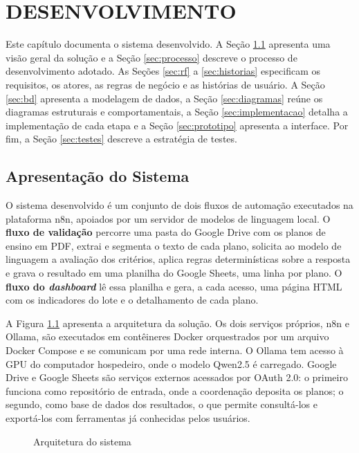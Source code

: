 \chapter{DESENVOLVIMENTO}
\label{cap:desenvolvimento}

Este capítulo documenta o sistema desenvolvido. A Seção \ref{sec:apresentacao} apresenta uma visão geral da solução e a Seção \ref{sec:processo} descreve o processo de desenvolvimento adotado. As Seções \ref{sec:rf} a \ref{sec:historias} especificam os requisitos, os atores, as regras de negócio e as histórias de usuário. A Seção \ref{sec:bd} apresenta a modelagem de dados, a Seção \ref{sec:diagramas} reúne os diagramas estruturais e comportamentais, a Seção \ref{sec:implementacao} detalha a implementação de cada etapa e a Seção \ref{sec:prototipo} apresenta a interface. Por fim, a Seção \ref{sec:testes} descreve a estratégia de testes.

\section{Apresentação do Sistema}
\label{sec:apresentacao}

O sistema desenvolvido é um conjunto de dois fluxos de automação executados na plataforma n8n, apoiados por um servidor de modelos de linguagem local. O \textbf{fluxo de validação} percorre uma pasta do Google Drive com os planos de ensino em PDF, extrai e segmenta o texto de cada plano, solicita ao modelo de linguagem a avaliação dos critérios, aplica regras determinísticas sobre a resposta e grava o resultado em uma planilha do Google Sheets, uma linha por plano. O \textbf{fluxo do \textit{dashboard}} lê essa planilha e gera, a cada acesso, uma página HTML com os indicadores do lote e o detalhamento de cada plano.

A Figura \ref{fig:arquitetura} apresenta a arquitetura da solução. Os dois serviços próprios, n8n e Ollama, são executados em contêineres Docker orquestrados por um arquivo Docker Compose e se comunicam por uma rede interna. O Ollama tem acesso à GPU do computador hospedeiro, onde o modelo Qwen2.5 é carregado. Google Drive e Google Sheets são serviços externos acessados por OAuth 2.0: o primeiro funciona como repositório de entrada, onde a coordenação deposita os planos; o segundo, como base de dados dos resultados, o que permite consultá-los e exportá-los com ferramentas já conhecidas pelos usuários.

\begin{figure}[htbp]
\centering
\caption{Arquitetura do sistema}
\label{fig:arquitetura}

\end{figure}

